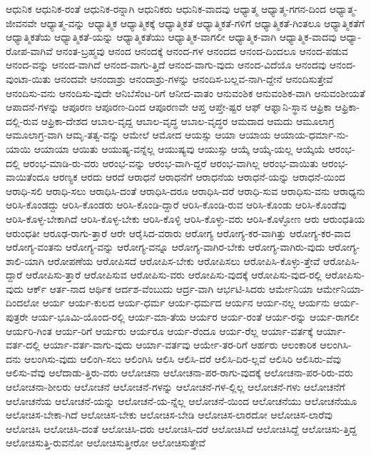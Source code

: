 {ಆಧುನಿಕ
ಆಧುನಿಕ-ರಂತೆ
ಆಧುನಿಕ-ರನ್ನಾಗಿ
ಆಧುನಿಕರು
ಆಧುನಿಕ-ವಾದವು
ಆಧ್ಯಾತ್ಮ
ಆಧ್ಯಾತ್ಮ-ಗಗನ-ದಿಂದ
ಆಧ್ಯಾತ್ಮ-ಜೀವನವೇ
ಆಧ್ಯಾತ್ಮ-ವನ್ನು
ಆಧ್ಯಾತ್ಮಿಕ
ಆಧ್ಯಾತ್ಮಿಕಕ್ಕೆ
ಆಧ್ಯಾತ್ಮಿಕತೆ
ಆಧ್ಯಾತ್ಮಿಕತೆ-ಗಳಿಗೆ
ಆಧ್ಯಾತ್ಮಿಕತೆ-ಗಿಂತಲೂ
ಆಧ್ಯಾತ್ಮಿಕತೆಗೆ
ಆಧ್ಯಾತ್ಮಿಕತೆಯ
ಆಧ್ಯಾತ್ಮಿಕತೆ-ಯನ್ನು
ಆಧ್ಯಾತ್ಮಿಕತೆಯು
ಆಧ್ಯಾತ್ಮಿಕ-ವಾಗಲೀ
ಆಧ್ಯಾತ್ಮಿಕ-ವಾಗಿ
ಆಧ್ಯಾತ್ಮಿಕ-ವಾದವು
ಆಧ್ಯಾ-ರೋಪ-ವಾಗಿವೆ
ಆನಂತ-ಬ್ರಹ್ಮವು
ಆನಂದ
ಆನಂದಕ್ಕೆ
ಆನಂದ-ಗಳ
ಆನಂದದ
ಆನಂದ-ದಿಂದಲೂ
ಆನಂದ-ಪಡುವ
ಆನಂದ-ವನ್ನು
ಆನಂದ-ವಾಗಿದೆ
ಆನಂದ-ವಾಗು-ತ್ತಿದೆ
ಆನಂದ-ವಾಗು-ವುದು
ಆನಂದ-ವಿದೆಯೊ
ಆನಂದವು
ಆನಂದ-ವುಂಟಾ-ಯಿತು
ಆನಂದವೇ
ಆನಂದಾಶ್ರು
ಆನಂದಾಶ್ರು-ಗಳನ್ನು
ಆನಂದಿಸ-ಬಲ್ಲವ-ನಾಗಿ-ದ್ದೇನೆ
ಆನಂದಿಸುತ್ತೇವೆ
ಆನಂದಿಸು-ವನು
ಆನಂದಿಸು-ವುದೇ
ಆನಿಬೆಸೆಂಟ-ರಿಗೆ
ಆನೀದ-ವಾತಂ
ಆನುವಂಶಿಕ
ಆನುವಂಶಿಕ-ವಾಗಿ
ಆನುವಂಶೀಯತೆ
ಆಪಾದನೆ-ಗಳನ್ನು
ಆಪೂರಣ
ಆಪೂರಣ-ದಿಂದ
ಆಪೂರಣವೇ
ಆಪ್ತ
ಆಪ್ತೇ-ಷ್ಟರ
ಆಫ್
ಆಫ್ಘಾನಿ-ಸ್ಥಾನ
ಆಫ್ರಿಕಾ
ಆಫ್ರಿಕಾ-ದಲ್ಲಿ-ರುವ
ಆಫ್ರಿಕಾ-ದೇಶದ
ಆಬಾಲ-ವೃದ್ದ
ಆಬಾಲ-ವೃದ್ಧ
ಆಬಾಲ-ವೃದ್ಧರ
ಆಮದಾದ
ಆಮದು
ಆಮೂಲಾಗ್ರ
ಆಮೂಲಾಗ್ರ-ವಾಗಿ
ಆಮೃ-ತತ್ವ-ವನ್ನು
ಆಮೇಲೆ
ಆಮೋದ
ಆಯಸ್ಸು
ಆಯಾ
ಆಯಾಯ
ಆಯಾಯ-ಧರ್ಮಾ-ನು-ಯಾಯಿ
ಆಯಾಯಾ
ಆಯಿತು
ಆಯುಷ್ಯ-ವನ್ನೆಲ್ಲ
ಆಯುಷ್ಯವು
ಆಯುಸ್ಸು
ಆಯ್ಕೆ
ಆಯ್ಕೆ-ಯಲ್ಲ
ಆಯ್ಕೆಯೆ
ಆರಂಭ-ದಲ್ಲಿ
ಆರಂಭ-ಮಾಡಿ-ರು-ವರು
ಆರಂಭ-ವನ್ನು
ಆರಂಭ-ವಾಗಿ-ದ್ದರೆ
ಆರಂಭ-ವಾಗಿಲ್ಲ
ಆರಂಭ-ವಾಯಿತು
ಆರಂಭ-ವಾಯಿತೆಂದೂ
ಆರಣ್ಯಕ
ಆರದು
ಆರದೆ
ಆರಾಧನೆ
ಆರಾಧನೆಗೆ
ಆರಾಧನೆಯ
ಆರಾಧನೆ-ಯನ್ನು
ಆರಾಧನೆ-ಯಿಂದ
ಆರಾಧಿ-ಸಲಿ
ಆರಾಧಿ-ಸಲು
ಆರಾಧಿಸಿ-ದಂತೆ
ಆರಾಧಿಸಿ-ದರೂ
ಆರಾಧಿಸಿ-ದರೆ
ಆರಾಧಿ-ಸುವ
ಆರಾಧಿಸು-ವನು
ಆರಾಧ್ಯನು
ಆರಿಸಿ-ಕೊಂಡದ್ದು
ಆರಿಸಿ-ಕೊಂಡರು
ಆರಿಸಿ-ಕೊಂಡಿ-ದ್ದಾರೆ
ಆರಿಸಿ-ಕೊಂಡಿ-ರುವ
ಆರಿಸಿ-ಕೊಂಡು
ಆರಿಸಿ-ಕೊಂಡೆವು
ಆರಿಸಿ-ಕೊಳ್ಳ-ಬೇಕಾಗಿದೆ
ಆರಿಸಿ-ಕೊಳ್ಳ-ಬೇಕು
ಆರಿಸಿ-ಕೊಳ್ಳಿ
ಆರಿಸಿ-ಕೊಳ್ಳು-ವರು
ಆರಿಸಿ-ಕೊಳ್ಳೋಣ
ಆರು
ಆರುಂಧತಿಯ
ಆರುಂಧತೀ
ಆರೂಢ-ರಾಗು-ತ್ತಾರೆ
ಆರೇ
ಆರೈಸಿದ-ವರಾರು
ಆರೋಗ್ಯ
ಆರೋಗ್ಯ-ಕರ-ವಾಗಿತ್ತು
ಆರೋಗ್ಯ-ಕರ-ವಾದ
ಆರೋಗ್ಯ-ವಂತನು
ಆರೋಗ್ಯ-ವನ್ನು
ಆರೋಗ್ಯ-ವನ್ನೂ
ಆರೋಗ್ಯ-ವಾಗಿರ-ಬೇಕು
ಆರೋಗ್ಯ-ವಾಗಿರು-ವುದು
ಆರೋಗ್ಯ-ಶಾಲಿ-ಯಾಗಿ
ಆರೋಪಣೆಯ
ಆರೋಪಿಸದೆ
ಆರೋಪಿಸ-ಬೇಕು
ಆರೋಪಿಸಲು
ಆರೋಪಿಸಿ-ಕೊಳ್ಳು-ತ್ತೇವೆ
ಆರೋಪಿಸಿ-ದ್ದಾರೆ
ಆರೋಪಿಸು-ತ್ತಾರೆ
ಆರೋಪಿಸುವ
ಆರೋಪಿಸು-ವರು
ಆರೋಪಿಸು-ವುದಕ್ಕೆ
ಆರೋಪಿಸು-ವುದ-ರಲ್ಲಿ
ಆರೋಪಿಸು-ವುದು
ಆರ್ಕ್
ಆರ್ತ-ನಾದ
ಆರ್ಥಿಕ
ಆರ್ದಶ-ವೆಂಬುದು
ಆರ್ದ್ರ-ವಾಗಿ
ಆರ್ಭಟಿ-ಸಿದರು
ಆರ್ಮೇನಿಯಾ
ಆರ್ಮೇನಿಯಾ-ದಿಂದಲೋ
ಆರ್ಯ
ಆರ್ಯ-ಕುಲದ
ಆರ್ಯ-ಧರ್ಮ
ಆರ್ಯ-ಧರ್ಮದ
ಆರ್ಯನ
ಆರ್ಯ-ನಲ್ಲ
ಆರ್ಯನು
ಆರ್ಯ-ಪುತ್ರರೇ
ಆರ್ಯ-ಭೂಮಿ-ಯೊಂದ-ರಲ್ಲಿ
ಆರ್ಯ-ಮಾ-ತೆಯ
ಆರ್ಯರ
ಆರ್ಯ-ರಂತೆ
ಆರ್ಯ-ರನ್ನು
ಆರ್ಯ-ರಾಗಲೀ
ಆರ್ಯರಿ-ಗಿಂತ
ಆರ್ಯ-ರಿಗೆ
ಆರ್ಯರು
ಆರ್ಯರೂ
ಆರ್ಯ-ರೆಂದೂ
ಆರ್ಯ-ರೆಲ್ಲ
ಆರ್ಯಾ-ವರ್ತಕ್ಕೆ
ಆರ್ಯಾ-ವರ್ತ-ದಲ್ಲಿ
ಆರ್ಯಾ-ವರ್ತ-ವಾಗು-ವುದು
ಆರ್ಯಾ-ವರ್ತವು
ಆರ್ಯೇ-ತರ-ರಿಗೆ
ಆರ್ಹರು
ಆಲಂಕಾರಿಕ
ಆಲಂಗಿಸಿ-ದನು
ಆಲಂಗಿಸು-ವುದು
ಆಲಿಂಗಿ-ಸಲು
ಆಲಿಂಗಿಸಿ
ಆಲಿಸಿ
ಆಲಿಸಿ-ದರೆ
ಆಲಿಸಿ-ದಿರ-ಲ್ಲವೆ
ಆಲಿಸಿರಿ
ಆಲಿಸಿರು-ವೆವು
ಆಲಿಸು-ವೆವು
ಆಲೆದಾಡು-ತ್ತಿರು-ವರು
ಆಲೋಚನಾ
ಆಲೋಚನಾ-ಪರ-ರಾಗು-ವುದಕ್ಕೆ
ಆಲೋಚನಾ-ಪರ-ರಿರು-ವರು
ಆಲೋಚನಾ-ಶೀಲರು
ಆಲೋಚನೆ
ಆಲೋಚನೆ-ಗಳನ್ನು
ಆಲೋಚನೆ-ಗಳ-ಲ್ಲಿಲ್ಲ
ಆಲೋಚನೆ-ಗಳು
ಆಲೋಚನೆಗೆ
ಆಲೋಚನೆಯ
ಆಲೋಚನೆ-ಯನ್ನು
ಆಲೋಚನೆ-ಯ-ನ್ನೆಲ್ಲ
ಆಲೋಚನೆ-ಯಿಂದ
ಆಲೋಚನೆಯು
ಆಲೋಚನೆಯೂ
ಆಲೋಚಿಸ-ಬೇಕಾ-ಗಿದೆ
ಆಲೋಚಿಸ-ಬೇಕು
ಆಲೋಚಿಸ-ಬೇಡಿ
ಆಲೋಚಿಸ-ಲಾರದೋ
ಆಲೋಚಿಸ-ಲಾರೆವು
ಆಲೋಚಿಸಿ
ಆಲೋಚಿಸಿ-ದಂತೆ
ಆಲೋಚಿಸಿ-ದರು
ಆಲೋಚಿಸಿ-ದರೆ
ಆಲೋಚಿಸಿದೆ
ಆಲೋಚಿಸಿದ್ದೆ
ಆಲೋಚಿಸು-ತ್ತಿದ್ದ
ಆಲೋಚಿಸುತ್ತಿ-ರುವನೋ
ಆಲೋಚಿಸುತ್ತೀರೋ
ಆಲೋಚಿಸುತ್ತೇವೆ
}
